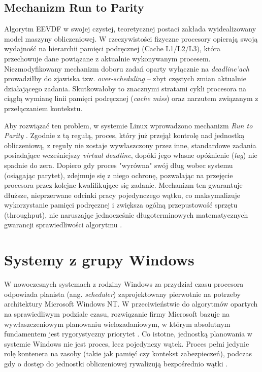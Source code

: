 \subsection{Mechanizm Run to Parity}
Algorytm EEVDF w swojej czystej, teoretycznej postaci zakłada wyidealizowany model maszyny obliczeniowej. W rzeczywistości fizyczne procesory opierają swoją wydajność na hierarchii pamięci podręcznej (Cache L1/L2/L3), która przechowuje dane powiązane z aktualnie wykonywanym procesem. Niezmodyfikowany mechanizm doboru zadań oparty wyłącznie na \textit{deadline'ach} prowadziłby do zjawiska tzw. \textit{over-scheduling} – zbyt częstych zmian aktualnie działającego zadania. Skutkowałoby to znacznymi stratami cykli procesora na ciągłą wymianę linii pamięci podręcznej (\textit{cache miss}) oraz narzutem związanym z przełączaniem kontekstu.

Aby rozwiązać ten problem, w systemie Linux wprowadzono mechanizm \textit{Run to Parity} \cite{lkmlRunToParity}. Zgodnie z tą regułą, proces, który już przejął kontrolę nad jednostką obliczeniową, z reguły nie zostaje wywłaszczony przez inne, standardowe zadania posiadające wcześniejszy \textit{virtual deadline}, dopóki jego własne opóźnienie (\textit{lag}) nie spadnie do zera. Dopiero gdy proces "wyrówna" swój dług wobec systemu (osiągając parytet), zdejmuje się z niego ochronę, pozwalając na przejęcie procesora przez kolejne kwalifikujące się zadanie. Mechanizm ten gwarantuje dłuższe, nieprzerwane odcinki pracy pojedynczego wątku, co maksymalizuje wykorzystanie pamięci podręcznej i zwiększa ogólną przepustowość sprzętu (throughput), nie naruszając jednocześnie długoterminowych matematycznych gwarancji sprawiedliwości algorytmu \cite{lkmlSchedV612}.






\section{Systemy z grupy Windows}
W nowoczesnych systemach z rodziny Windows za przydział czasu procesora odpowiada planista (ang. \textit{scheduler}) zaprojektowany pierwotnie na potrzeby architektury Microsoft Windows NT. W przeciwieństwie do algorytmów opartych na sprawiedliwym podziale czasu, rozwiązanie firmy Microsoft bazuje na wywłaszczeniowym planowaniu wielozadaniowym, w którym absolutnym fundamentem jest rygorystyczny priorytet \cite{loyolaProcThreadScheduling}. Co istotne, jednostką planowania w systemie Windows nie jest proces, lecz pojedynczy wątek. Proces pełni jedynie rolę kontenera na zasoby (takie jak pamięć czy kontekst zabezpieczeń), podczas gdy o dostęp do jednostki obliczeniowej rywalizują bezpośrednio wątki \cite{msLearnProcessesThreads}.


